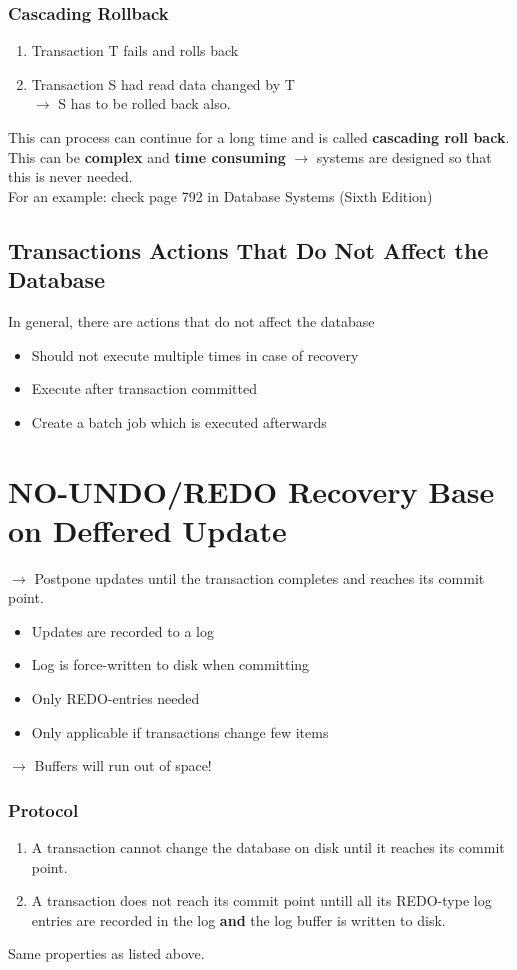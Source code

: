 \subsubsection{Cascading Rollback}
\begin{enumerate}
	\item Transaction T fails and rolls back
	\item Transaction S had read data changed by T \\ $\rightarrow$ S has to be rolled back also.
\end{enumerate}
This can process can continue for a long time and is called \textbf{cascading roll back}.
This can be \textbf{complex} and \textbf{time consuming} $\rightarrow$ systems are designed so that this is never needed.
\\
For an example: check page 792 in Database Systems (Sixth Edition)
\subsection{Transactions Actions That Do Not Affect the Database}
In general, there are actions that do not affect the database
\begin{itemize}
	\item Should not execute multiple times in case of recovery
	\item Execute after transaction committed
	\item Create a batch job which is executed afterwards
\end{itemize}
\section{NO-UNDO/REDO Recovery Base on Deffered Update}
$\rightarrow$ Postpone updates until the transaction completes and reaches its commit point.
\begin{itemize}
	\item Updates are recorded to a log
	\item Log is force-written to disk when committing
	\item Only REDO-entries needed
	\item Only applicable if transactions change few items
\end{itemize}
$\rightarrow$ Buffers will run out of space!
\subsubsection{Protocol}
\begin{enumerate}
	\item A transaction cannot change the database on disk until it reaches its commit point.
	\item A transaction does not reach its commit point untill all its REDO-type log entries are recorded in the log \textbf{and} the log buffer is written to disk.
\end{enumerate}
Same properties as listed above.
